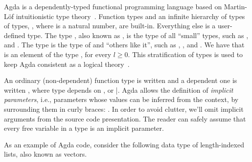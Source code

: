 \documentclass[sigconf]{acmart}
\begin{document}
Agda is a dependently-typed functional programming language based on
Martin-L\"of intuitionistic type theory~\cite{Lof98}.  Function types
and an infinite hierarchy of types of types, , where
 is a natural number, are built-in. Everything else is a user-defined
type. The type , also known as , is the type of all
``small'' types, such as ,  and
.  The type  is the type of 
and ``others like it'', such as , , and
. We have that  is an
element of the type , for every $l \geq 0$. This
stratification of types is used to keep Agda consistent as a logical
theory~\cite{Sorensen2006}.

An ordinary (non-dependent) function type is written  and a
dependent one is written , where type 
depends on , or |. Agda allows the
definition of \emph{implicit parameters}, i.e.,  parameters whose values can be
inferred from the context, by surrounding them in curly braces:
. In order to avoid clutter, we'll omit implicit
arguments from the source code presentation. The reader can safely assume
that every free variable in a type is an implicit parameter.

As an example of Agda code, consider the following data type of
length-indexed lists, also known as vectors.
\end{document}
